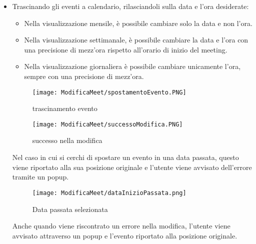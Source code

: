 \begin{itemize}
    \item Trascinando gli eventi a calendario, rilasciandoli sulla data e l'ora desiderate:
        \begin{itemize}
            \item Nella visualizzazione mensile, è possibile cambiare solo la data e non l'ora.
            \item Nella visualizzazione settimanale, è possibile cambiare la data e l'ora con una precisione di mezz'ora rispetto
            all'orario di inizio del meeting.
            \item Nella visualizzazione giornaliera è possibile cambiare unicamente l'ora, sempre con una precisione di mezz'ora.
        \end{itemize}
        \begin{figure}[H]
            \centering
            \begin{minipage}{0.45\textwidth}
                \centering
                \texttt{[image: ModificaMeet/spostamentoEvento.PNG]}
                \caption{trascinamento evento}
            \end{minipage}
            \hspace{0.05\textwidth}
            \begin{minipage}{0.45\textwidth}
                \centering
                \texttt{[image: ModificaMeet/successoModifica.PNG]}
                \caption{successo nella modifica}
            \end{minipage}
        \end{figure}
        Nel caso in cui si cerchi di spostare un evento in una data passata, questo viene riportato alla sua posizione originale 
        e l'utente viene avvisato dell'errore tramite un popup.
    \begin{figure}[H]   
        \centering
        \texttt{[image: ModificaMeet/dataInizioPassata.png]}
        \caption{Data passata selezionata}
    \end{figure}
    Anche quando viene riscontrato un errore nella modifica, l'utente viene avvisato attraverso un popup e l'evento riportato
    alla posizione originale.
\end{itemize}
